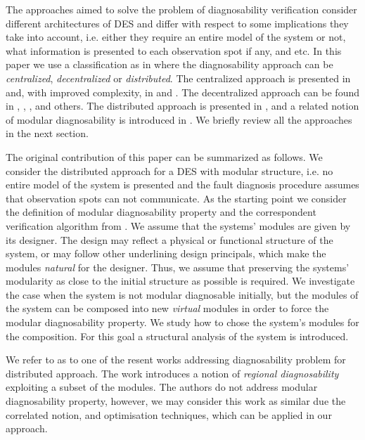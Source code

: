 \documentclass[letterpaper, 10pt, conference]{ieeeconf}
\begin{document}
The approaches aimed to solve the problem of diagnosability verification
consider different architectures of DES and differ with respect to some
implications they take into account, i.e. either they require an entire model of
the system or not, what information is presented to each observation spot if any,
and etc. In this paper we use a classification as in \cite{su_global_2005} where
the diagnosability approach can be \emph{centralized},
\emph{decentralized} or \emph{distributed}. The centralized approach is
presented in \cite{sampath_diagnosability_1995} and, with improved complexity,
in \cite{jiang_polynomial_2001} and \cite{yoo_polynomial-time_2002}.
The decentralized approach can be found in \cite{debouk_coordinated_1998},
\cite{pencole_formal_2005}, \cite{qiu_decentralized_2006},
\cite{wang_diagnosis_2007} and others.
The distributed approach is presented in \cite{su_distributed_2002}, and a
related notion of modular diagnosability is introduced in
\cite{contant_diagnosability_2006}. We briefly review all the approaches in the
next section.

The original contribution of this paper can be summarized as follows. We
consider the distributed approach for a DES with modular structure, i.e. no
entire model of the system is presented and the fault diagnosis procedure
assumes that observation spots can not communicate. As the starting point we
consider the definition of modular diagnosability property and the correspondent
verification algorithm from \cite{contant_diagnosability_2006}. We assume that
the systems' modules are given by its designer. The design may reflect a
physical or functional structure of the system, or may follow other underlining
design principals, which make the modules \emph{natural} for the designer.
Thus, we assume that preserving the systems' modularity as close to the initial
structure as possible is required. We investigate the case when the system is
not modular diagnosable initially, but the modules of the system can be composed
into new \emph{virtual} modules in order to force the modular diagnosability
property. We study how to chose the system's modules for the composition. For
this goal a structural analysis of the system is introduced. 

We refer to \cite{ye_optimized_2010} as to one of the resent works addressing
diagnosability problem for distributed approach. The work introduces a notion of
\emph{regional diagnosability} exploiting a subset of the modules. The authors
do not address modular diagnosability property, however, we may consider this
work as similar due the correlated notion, and optimisation techniques, which
can be applied in our approach.
\end{document}
